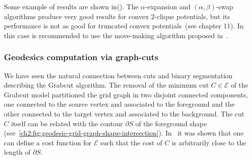 Some example of results are shown in(). The $\alpha$-expansion and $(\alpha,\beta)$-swap  algorithms produce very good results for convex $2$-clique potentials, but its performance is not as good for truncated convex potentials~\cite{blake11markov}(see chapter 11). In this case is recommended to use the move-making algorithm proposed in~\cite{ishikawa03}. 



%
%
%
%



\subsubsection{Geodesics computation via graph-cuts}

We have seen the natural connection between cuts and binary segmentation describing the Grabcut algorithm. The removal of the minimum cut $C \in \mathcal{E}$ of the Grabcut model partitioned the grid graph in two disjoint connected components, one connected to the source vertex and associated to the foreground and the other connected to the target vertex and associated to the background. The cut $C$ itself can be related with the contour $\partial S$ of the foreground shape (see~\cref{ch2:fig:geodesic-grid-graph-shape-intersection}). In~\cite{boykov03geodesics} it was shown that one can define a cost function for $\mathcal{E}$ such that the cost of $C$ is arbitrarily close to the length of $\partial S$.

